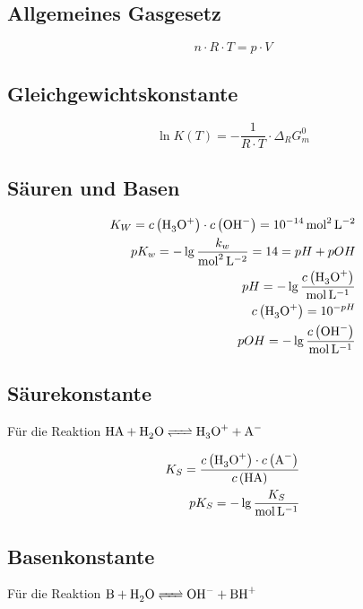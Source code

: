 \subsection{Allgemeines Gasgesetz}

\begin{equation}
\label{eq:chemie:allgemeines:gasgesetz}
n \cdot R \cdot T = p \cdot V
\end{equation}

\subsection{Gleichgewichtskonstante}

\begin{equation}\label{eq:chemie:gleichgewichtskonstante}
\ln K(T) = - \frac{1}{R \cdot T} \cdot \Delta_R G_m^0
\end{equation}

\subsection{Säuren und Basen}

\begin{align}
\label{eq:chemie:saeuren:basen}
K_W = c\left(\ce{H3O+}\right) \cdot c\left(\ce{OH-}\right) = \SI{e-14}{\mol\squared\per\litre\squared}\\
pK_w = -\lg\frac{k_w}{\si{\mol\squared\per\litre\squared}} = 14 = pH + pOH\\
pH = -\lg\frac{c\left(\ce{H3O+}\right)}{\si{\mol\per\litre}}\\
c\left(\ce{H3O+}\right) = 10^{-pH}\\
pOH = -\lg\frac{c\left(\ce{OH-}\right)}{\si{\mol\per\litre}}
\end{align}

\subsection{Säurekonstante}
Für die Reaktion $\ce{HA + H2O <=> H3O+ + A-}$

\begin{align}
K_S = \frac{c\left(\ce{H3O+}\right) \cdot c\left(\ce{A-}\right)}{c\left(\ce{HA}\right)}\\
pK_S = -\lg\frac{K_S}{\si{\mol\per\litre}}
\end{align}

\subsection{Basenkonstante}
Für die Reaktion $\ce{B + H2O <=> OH- + BH+}$


